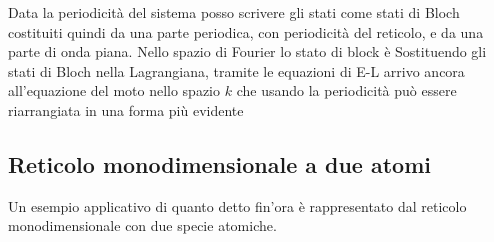 \documentclass[a4paper,12pt]{article}
\begin{document}
Data la periodicità del sistema posso scrivere gli stati come stati di Bloch costituiti quindi da una parte periodica, con periodicità del reticolo, e da una parte di onda piana. Nello spazio di Fourier lo stato di block è
Sostituendo gli stati di Bloch nella Lagrangiana, tramite le equazioni di E-L arrivo ancora all'equazione del moto nello spazio $k$
che usando la periodicità può essere riarrangiata in una forma più evidente
\subsection{Reticolo monodimensionale a due atomi}
Un esempio applicativo di quanto detto fin'ora è rappresentato dal reticolo monodimensionale con due specie atomiche.
\end{document}
